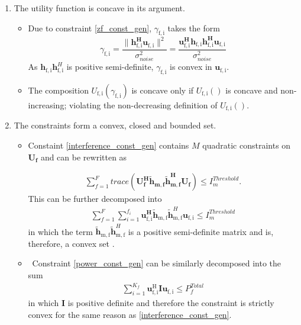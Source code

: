 \documentclass[12pt,a4paper]{report}
\begin{document}
\begin{enumerate}
\item The utility function is concave in its argument.
\begin{itemize}
\item 
Due to constraint \eqref{zf_const_gen}, $\gamma_{\mathrm{f,i}}$ takes the form
	\begin{equation}\label{zf_snr}
	\gamma_{\mathrm{f,i}} = \frac{\|\mathbf{h^H_{\mathrm{f,i}}u_{\mathrm{f,i}}}\|^2}
	{\sigma^2_{noise}  
	}
	= 
	\frac{\mathbf{u^H_{\mathrm{f,i}}h_{\mathrm{f,i}}h^H_{\mathrm{f,i}}u_{\mathrm{f,i}}}}
	{\sigma^2_{noise}  
	}
	\end{equation}
	As $\mathbf{h}_{\mathrm{f,i}}\mathbf{h}^H_{\mathrm{f,i}}$ is positive semi-definite, $\gamma_{\mathrm{f,i}}$ is convex in ${\mathbf{u}_{\mathrm{f,i}}}$. 
\item
The composition $U_{\mathrm{f,i}}(\gamma_{\mathrm{f,i}}) $ is concave only if $U_{\mathrm{f,i}}() $ is concave and non-increasing; violating the non-decreasing definition of $U_{\mathrm{f,i}}() $.
\end{itemize}

\item
The constraints form a convex, closed and bounded set. 

\begin{itemize}

\item
	Constaint \eqref{interference_const_gen} contains $M$ quadratic constraints on $\mathbf{U_f}$ and 
	can be rewritten as 

\begin{gather*}
	\sum_{f=1}^F
	trace(\mathbf{U_f^H} \mathbf{\tilde{h}_{m,f}} \mathbf{\tilde{h}_{m,f}^H} \mathbf{U_f} )\leq 
	I^{Threshold}_{m}.
\end{gather*}
This can be further decomposed into  
	\begin{gather*}
	\sum_{f=1}^F
	\sum_{i=1}^{f_i}
	\mathbf{u_{\mathrm{f,i}}^H}\mathbf{\tilde{h}_{\mathrm{m,f}}} \mathbf{\tilde{h}}_{\mathrm{m,f}}^H
	\mathbf{u_{\mathrm{f,i}}} \leq I^{Threshold}_{m}
	\end{gather*}
in which the term $ \mathbf{\tilde{h}_{\mathrm{m,f}}} \mathbf{\tilde{h}}_{\mathrm{m,f}}^H$ is  a positive semi-definite matrix and is, therefore, a convex set 
\cite[p.8,9]{BoV:04}. 


\item \
	Constraint \eqref{power_const_gen} can be similarly decomposed into the sum
	\begin{gather*}
		\sum_{i=1}^{K_f}\mathbf{u_{\mathrm{f,i}}^{\mathrm{H}}} \mathbf{I} 		
		\mathbf{u_{\mathrm{f,i}}} \leq  P^{Total}_{f}
	\end{gather*}
	in which $\mathbf{I}$ is positive definite and 			
	therefore the constraint is strictly convex for the same 		
	reason as \eqref{interference_const_gen}.
\end{itemize}


\end{enumerate}
\end{document}
